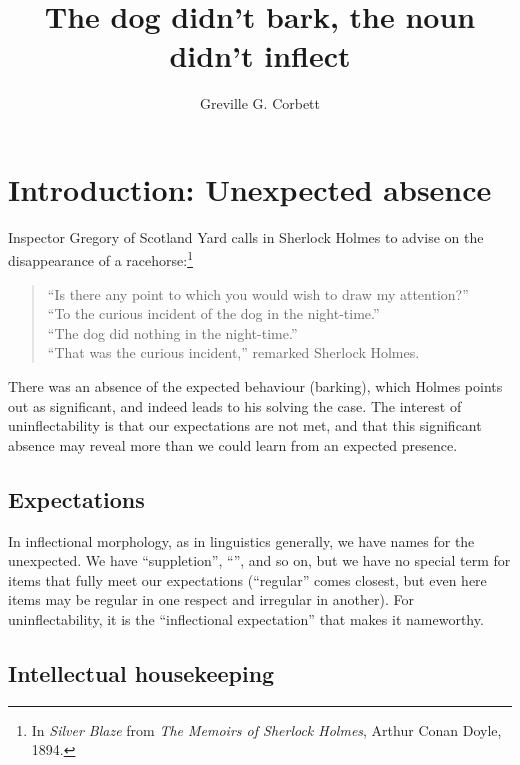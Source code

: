 \documentclass[output=paper,colorlinks,citecolor=brown]{langscibook}
\title{The dog didn’t bark, the noun didn’t inflect}
\author{Greville G. Corbett\orcid{}\affiliation{Surrey Morphology Group ; Department of Human Behavior, Ecology and Culture, Max Planck Institute for Evolutionary Anthropology, Leipzig}}
\begin{document}
\maketitle

\section{Introduction: Unexpected absence}

Inspector Gregory of Scotland Yard calls in Sherlock Holmes to advise on the disappearance of a racehorse:\footnote{In \textit{Silver Blaze} from \textit{The Memoirs of Sherlock Holmes}, Arthur Conan Doyle, 1894.}

\begin{quote}
	``Is there any point to which you would wish to draw my attention?'' \\
	``To the curious incident of the dog in the night-time.'' \\
	``The dog did nothing in the night-time.''  \\
	``That was the curious incident,'' remarked Sherlock Holmes. \\
\end{quote}

There was an absence of the expected behaviour (barking), which Holmes points out as significant, and indeed leads to his solving the case. The interest of uninflectability is that our expectations are not met, and that this significant absence may reveal more than we could learn from an expected presence.

\subsection{Expectations}

In inflectional morphology, as in linguistics generally, we have names for the unexpected. We have ``suppletion'', ``'', and so on, but we have no special term for items that fully meet our expectations (``regular'' comes closest, but even here items may be regular in one respect and irregular in another). For uninflectability, it is the ``inflectional expectation'' \citep[146]{spencer2020} that makes it nameworthy.

\subsection{Intellectual housekeeping}
\end{document}
